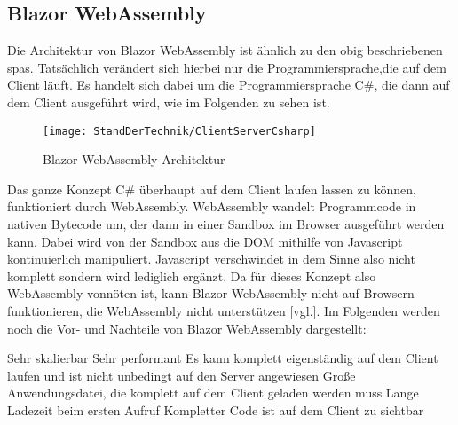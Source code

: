 \subsection{Blazor WebAssembly}
Die Architektur von Blazor WebAssembly ist ähnlich zu den obig beschriebenen \ac{spa}s. Tatsächlich
verändert sich hierbei nur die Programmiersprache,die auf dem
Client läuft. Es handelt sich dabei um die Programmiersprache C\#, die dann auf dem Client
ausgeführt wird, wie im Folgenden zu sehen ist.
\begin{figure}[h]
    \centering
    \texttt{[image: StandDerTechnik/ClientServerCsharp]}
    \caption[Blazor WebAssembly Architektur]{Blazor WebAssembly Architektur}
    \label{img:clientservercsharp}
\end{figure}
\newline
\newline
Das ganze Konzept C\# überhaupt auf dem Client laufen lassen zu können, funktioniert durch
WebAssembly. WebAssembly wandelt Programmcode in nativen Bytecode um, der dann in einer Sandbox
im Browser ausgeführt werden kann. Dabei wird von der Sandbox aus die DOM mithilfe von
Javascript kontinuierlich manipuliert. Javascript verschwindet in dem Sinne also nicht komplett
sondern wird lediglich ergänzt.
Da für dieses Konzept also WebAssembly vonnöten ist, kann Blazor WebAssembly nicht auf Browsern
funktionieren, die WebAssembly nicht unterstützen \cite{HierKommtBlazor}[vgl.].
\newline
\newline
Im Folgenden werden noch die Vor- und Nachteile von Blazor WebAssembly dargestellt:
\begin{itemize}
    \pro Sehr skalierbar
    \pro Sehr performant
    \pro Es kann komplett eigenständig auf dem Client laufen und ist nicht unbedingt auf den
    Server angewiesen
    \con Große Anwendungsdatei, die komplett auf dem Client geladen werden muss
    \con Lange Ladezeit beim ersten Aufruf
    \con Kompletter Code ist auf dem Client zu sichtbar
\end{itemize}

